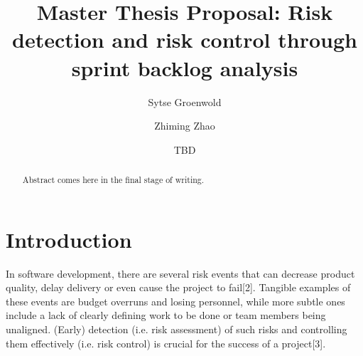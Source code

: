 \documentclass[sigconf]{acmart}
\begin{document}
\title{Master Thesis Proposal: Risk detection and risk control through sprint backlog analysis}

\author{Sytse Groenwold}

\author{Zhiming Zhao}

\author{TBD}

\renewcommand{\shortauthors}{Groenwold, S.}

\begin{abstract}

Abstract comes here in the final stage of writing. \\

\end{abstract}


\maketitle

\section{Introduction}
In software development, there are several risk events that can decrease product quality, delay delivery or even cause the project to fail[2]. 
Tangible examples of these events are budget overruns and losing personnel, while more subtle ones include a lack of clearly defining work to be done or team members being unaligned. 
(Early) detection (i.e. risk assessment) of such risks and controlling them effectively (i.e. risk control) is crucial for the success of a project[3].
\end{document}

